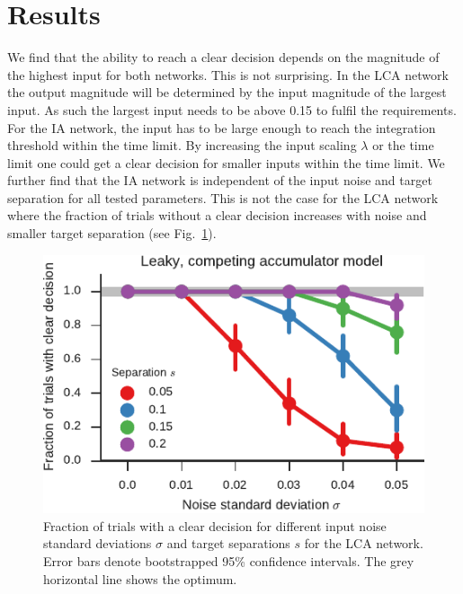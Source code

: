 \documentclass[10pt,letterpaper]{article}
\begin{document}
\section{Results}
We find that the ability to reach a clear decision depends on the magnitude of the highest input for both networks.
This is not surprising.
In the LCA network the output magnitude will be determined by the input magnitude of the largest input.
As such the largest input needs to be above 0.15 to fulfil the requirements.
For the IA network, the input has to be large enough to reach the integration threshold within the time limit.
By increasing the input scaling $\lambda$ or the time limit one could get a clear decision for smaller inputs within the time limit.
We further find that the IA network is independent of the input noise and target separation for all tested parameters.
This is not the case for the LCA network where the fraction of trials without a clear decision increases with noise and smaller target separation (see Fig.~\ref{fig:decisions}).
\begin{figure}
    \centering
    \includegraphics{figures/decisions}
    \caption{ \label{fig:decisions}
        Fraction of trials with a clear decision for different input noise standard deviations $\sigma$ and target separations $s$ for the LCA network.
        Error bars denote bootstrapped 95\% confidence intervals.
        The grey horizontal line shows the optimum.
    }
\end{figure}
\end{document}
